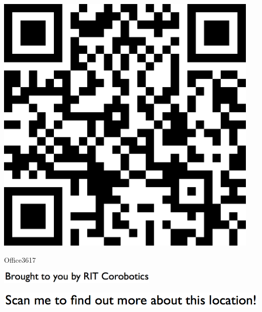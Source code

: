 \documentclass[letterpaper]{article}
\begin{document}
 \begingroup 
 \centerline{\includegraphics[scale=1,width=5in,height=5in]{Office3617.png}} 
 \endgroup 
 \vspace*{\fill} 

 \hfill{\small Office3617} 

  \vspace{0.7in} 
 
 \centerline{\includegraphics[scale=1,width=3in]{text-bottom.png}} 
 
 \pagebreak 
{} 
 \vspace*{\fill} 
 
  \centerline{\includegraphics[scale=1,width=6in]{text-top.png}} 
 
 \vspace{0.5in} 
 
\end{document}
